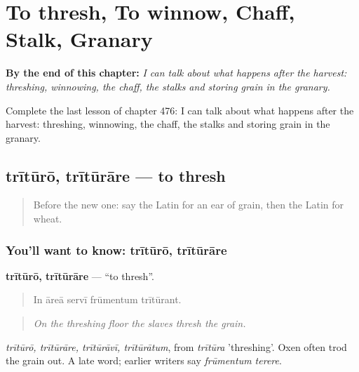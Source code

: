 
\chapter{To thresh, To winnow, Chaff, Stalk, Granary}
\label{ch:la-to-thresh-to-winnow-chaff-stalk-granary}

\begin{chapteropening}
\textbf{By the end of this chapter:} \emph{I can talk about what happens after the harvest: threshing, winnowing, the chaff, the stalks and storing grain in the granary.}

Complete the last lesson of chapter 476: I can talk about what happens after the harvest: threshing, winnowing, the chaff, the stalks and storing grain in the granary.
\end{chapteropening}

\section[trītūrō, trītūrāre]{trītūrō, trītūrāre — to thresh}

\label{lesson:LA-C476-trituro}



\begin{quote}
Before the new one: say the Latin for an ear of grain, then the Latin for wheat.
\end{quote}

\subsection*{You'll want to know: trītūrō, trītūrāre}
\textbf{trītūrō, trītūrāre} — \textquotedblleft{}to thresh\textquotedblright{}.

\begin{quote}
In āreā servī frūmentum trītūrant.
\end{quote}

\begin{quote}
\emph{On the threshing floor the slaves thresh the grain.}
\end{quote}

\emph{trītūrō, trītūrāre, trītūrāvī, trītūrātum}, from \emph{trītūra} 'threshing'. Oxen often trod the grain out. A late word; earlier writers say \emph{frūmentum terere}.

